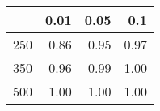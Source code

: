% 
\begin{tabular}{rrrr}
  \hline
 & 0.01 & 0.05 & 0.1 \\ 
  \hline
250 & 0.86 & 0.95 & 0.97 \\ 
  350 & 0.96 & 0.99 & 1.00 \\ 
  500 & 1.00 & 1.00 & 1.00 \\ 
   \hline
\end{tabular}
